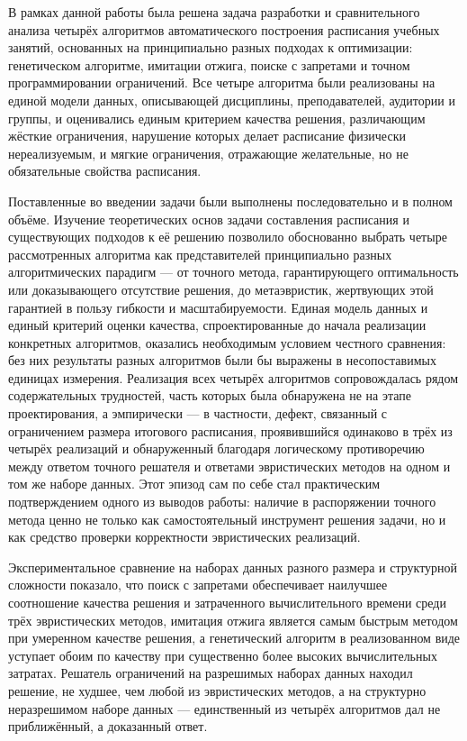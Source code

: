 
В рамках данной работы была решена задача разработки и сравнительного анализа четырёх алгоритмов автоматического построения расписания учебных занятий, основанных на принципиально разных подходах к оптимизации: генетическом алгоритме, имитации отжига, поиске с запретами и точном программировании ограничений. Все четыре алгоритма были реализованы на единой модели данных, описывающей дисциплины, преподавателей, аудитории и группы, и оценивались единым критерием качества решения, различающим жёсткие ограничения, нарушение которых делает расписание физически нереализуемым, и мягкие ограничения, отражающие желательные, но не обязательные свойства расписания.

Поставленные во введении задачи были выполнены последовательно и в полном объёме. Изучение теоретических основ задачи составления расписания и существующих подходов к её решению позволило обоснованно выбрать четыре рассмотренных алгоритма как представителей принципиально разных алгоритмических парадигм — от точного метода, гарантирующего оптимальность или доказывающего отсутствие решения, до метаэвристик, жертвующих этой гарантией в пользу гибкости и масштабируемости. Единая модель данных и единый критерий оценки качества, спроектированные до начала реализации конкретных алгоритмов, оказались необходимым условием честного сравнения: без них результаты разных алгоритмов были бы выражены в несопоставимых единицах измерения. Реализация всех четырёх алгоритмов сопровождалась рядом содержательных трудностей, часть которых была обнаружена не на этапе проектирования, а эмпирически — в частности, дефект, связанный с ограничением размера итогового расписания, проявившийся одинаково в трёх из четырёх реализаций и обнаруженный благодаря логическому противоречию между ответом точного решателя и ответами эвристических методов на одном и том же наборе данных. Этот эпизод сам по себе стал практическим подтверждением одного из выводов работы: наличие в распоряжении точного метода ценно не только как самостоятельный инструмент решения задачи, но и как средство проверки корректности эвристических реализаций.

Экспериментальное сравнение на наборах данных разного размера и структурной сложности показало, что поиск с запретами обеспечивает наилучшее соотношение качества решения и затраченного вычислительного времени среди трёх эвристических методов, имитация отжига является самым быстрым методом при умеренном качестве решения, а генетический алгоритм в реализованном виде уступает обоим по качеству при существенно более высоких вычислительных затратах. Решатель ограничений на разрешимых наборах данных находил решение, не худшее, чем любой из эвристических методов, а на структурно неразрешимом наборе данных — единственный из четырёх алгоритмов дал не приближённый, а доказанный ответ.

